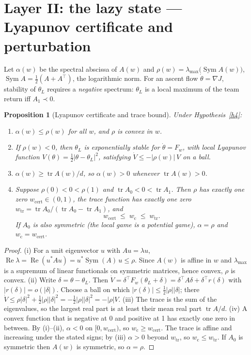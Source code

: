 \documentclass[11pt]{article}
\newtheorem{proposition}{Proposition}
\theoremstyle{definition}
\theoremstyle{remark}
\newcommand{\wcrit}{w_{\mathrm c}}
\newcommand{\Sym}{\operatorname{Sym}}
\newcommand{\tr}{\operatorname{tr}}
\begin{document}
\section{Layer II: the lazy state --- Lyapunov certificate and perturbation}

Let $\alpha(w)$ be the spectral abscissa of $A(w)$ and $\rho(w)=\lambda_{\max}\big(\Sym A(w)\big)$, $\Sym A=\tfrac12(A+A^\top)$, the logarithmic norm. For an ascent flow $\dot\theta=\nabla J$, stability of $\theta_L$ requires a \emph{negative} spectrum: $\theta_L$ is a local maximum of the team return iff $A_1\prec0$.

\begin{proposition}[Lyapunov certificate and trace bound]\label{p1}
Under Hypothesis~\ref{h4}:
\begin{enumerate}[label=(\roman*)]
\item $\alpha(w)\le\rho(w)$ for all $w$, and $\rho$ is convex in $w$.
\item If $\rho(w)<0$, then $\theta_L$ is exponentially stable for $\dot\theta=F_w$, with local Lyapunov function $V(\theta)=\tfrac12|\theta-\theta_L|^2$, satisfying $\dot V\le-|\rho(w)|\,V$ on a ball.
\item $\alpha(w)\ge\tr A(w)/d$, so $\alpha(w)>0$ whenever $\tr A(w)>0$.
\item Suppose $\rho(0)<0<\rho(1)$ and $\tr A_0<0<\tr A_1$. Then $\rho$ has exactly one zero $w_{\mathrm{cert}}\in(0,1)$, the trace function has exactly one zero $w_{\mathrm{tr}}=\tr A_0/(\tr A_0-\tr A_1)$, and
\[
w_{\mathrm{cert}}\;\le\;\wcrit\;\le\;w_{\mathrm{tr}} .
\]
If $A_0$ is also symmetric (the local game is a potential game), $\alpha=\rho$ and $\wcrit=w_{\mathrm{cert}}$.
\end{enumerate}
\end{proposition}
\begin{proof}
(i) For a unit eigenvector $u$ with $Au=\lambda u$, $\operatorname{Re}\lambda=\operatorname{Re}(u^*Au)=u^*\Sym(A)\,u\le\rho$. Since $A(w)$ is affine in $w$ and $\lambda_{\max}$ is a supremum of linear functionals on symmetric matrices, hence convex, $\rho$ is convex.
(ii) Write $\delta=\theta-\theta_L$. Then $\dot V=\delta^\top F_w(\theta_L+\delta)=\delta^\top A\delta+\delta^\top r(\delta)$ with $|r(\delta)|=o(|\delta|)$. Choose a ball on which $|r(\delta)|\le\frac12|\rho||\delta|$; there $\dot V\le\rho|\delta|^2+\frac12|\rho||\delta|^2=-\frac12|\rho||\delta|^2=-|\rho|V$.
(iii) The trace is the sum of the eigenvalues, so the largest real part is at least their mean real part $\tr A/d$.
(iv) A convex function that is negative at 0 and positive at 1 has exactly one zero in between. By (i)--(ii), $\alpha<0$ on $[0,w_{\mathrm{cert}})$, so $\wcrit\ge w_{\mathrm{cert}}$. The trace is affine and increasing under the stated signs; by (iii) $\alpha>0$ beyond $w_{\mathrm{tr}}$, so $\wcrit\le w_{\mathrm{tr}}$. If $A_0$ is symmetric then $A(w)$ is symmetric, so $\alpha=\rho$.
\end{proof}
\end{document}
